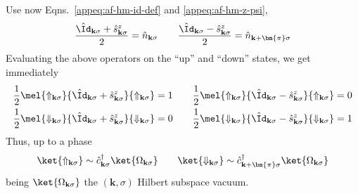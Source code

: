 Use now Eqns.~\eqref{appeq:af-hm-id-def} and \eqref{appeq:af-hm-z-psi},
\[
	\frac{\hat \Id_{\mathbf{k}\sigma} + \hat s_{\mathbf{k}\sigma}^z}{2} = \hat n_{\mathbf{k}\sigma}
	\qquad
	\frac{\hat \Id_{\mathbf{k}\sigma} - \hat s_{\mathbf{k}\sigma}^z}{2} = \hat n_{\mathbf{k}+\bm{\pi}\sigma}
\]
Evaluating the above operators on the ``up'' and ``down'' states, we get immediately
\[
\begin{aligned}
	\frac{1}{2} \mel{\Uparrow_{\mathbf{k}\sigma}}{\hat \Id_{\mathbf{k}\sigma} + \hat s_{\mathbf{k}\sigma}^z}{\Uparrow_{\mathbf{k}\sigma}} &= 1 \\
	\frac{1}{2} \mel{\Downarrow_{\mathbf{k}\sigma}}{\hat \Id_{\mathbf{k}\sigma} + \hat s_{\mathbf{k}\sigma}^z}{\Downarrow_{\mathbf{k}\sigma}} &= 0
\end{aligned}
\qquad
\begin{aligned}
	\frac{1}{2} \mel{\Uparrow_{\mathbf{k}\sigma}}{\hat \Id_{\mathbf{k}\sigma} - \hat s_{\mathbf{k}\sigma}^z}{\Uparrow_{\mathbf{k}\sigma}} &= 0 \\
	\frac{1}{2} \mel{\Downarrow_{\mathbf{k}\sigma}}{\hat \Id_{\mathbf{k}\sigma} - \hat s_{\mathbf{k}\sigma}^z}{\Downarrow_{\mathbf{k}\sigma}} &= 1
\end{aligned}
\]
Thus, up to a phase
\[
	\ket{\Uparrow_{\mathbf{k}\sigma}} \sim \hat c_{\mathbf{k}\sigma}^\dagger \ket{\Omega_{\mathbf{k}\sigma}}
	\qquad
	\ket{\Downarrow_{\mathbf{k}\sigma}} \sim \hat c_{\mathbf{k}+\bm{\pi}\sigma}^\dagger \ket{\Omega_{\mathbf{k}\sigma}}
\]
being $\ket{\Omega_{\mathbf{k}\sigma}}$ the $(\mathbf{k},\sigma)$ Hilbert subspace vacuum. 

